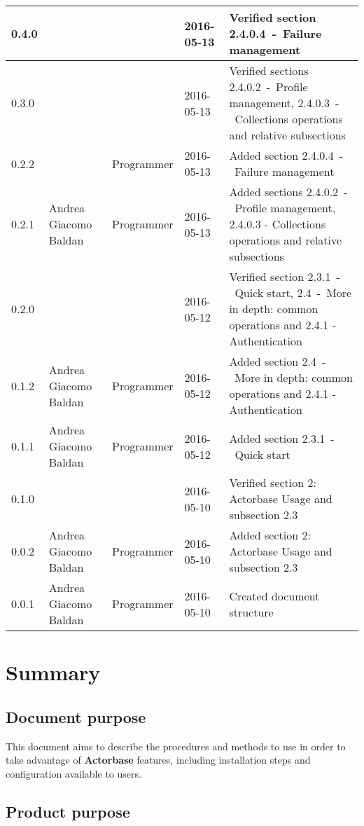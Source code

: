 \documentclass{scalatekids-article}
\begin{document}
\begin{center}
\begin{longtable}{| l | l | l | l | p{5cm} |}
    \hline
    0.4.0 & & & 2016-05-13 & Verified section 2.4.0.4\ -\ Failure management\\
    \hline
    0.3.0 & & & 2016-05-13 & Verified sections 2.4.0.2\ -\ Profile management, 2.4.0.3\ -\ Collections operations and relative subsections\\
    \hline
    0.2.2 & & Programmer & 2016-05-13 & Added section 2.4.0.4\ -\ Failure management\\
    \hline
    0.2.1 & Andrea Giacomo Baldan & Programmer & 2016-05-13 & Added sections 2.4.0.2\ -\ Profile management, 2.4.0.3 - Collections operations and relative subsections\\
    \hline
    0.2.0 &  &  & 2016-05-12 & Verified section 2.3.1\ -\ Quick start, 2.4\ -\ More in depth: common operations and 2.4.1 - Authentication\\
    \hline
    0.1.2 & Andrea Giacomo Baldan & Programmer & 2016-05-12 & Added section 2.4\ -\ More in depth: common operations and 2.4.1 - Authentication\\
    \hline
    0.1.1 & Andrea Giacomo Baldan & Programmer & 2016-05-12 & Added section 2.3.1\ -\ Quick start\\
    \hline
    0.1.0 &  &  & 2016-05-10 & Verified section 2: Actorbase Usage and subsection 2.3\\
    \hline
    0.0.2 & Andrea Giacomo Baldan & Programmer & 2016-05-10 & Added section 2: Actorbase Usage and subsection 2.3\\
    \hline
    0.0.1 & Andrea Giacomo Baldan & Programmer & 2016-05-10 & Created document structure\\
    \hline
  \end{longtable}
\end{center}
\tableofcontents
\newpage
{}
\section{Summary}

\subsection{Document purpose}

This document aims to describe the procedures and methods to use in order to take
advantage of \textbf{Actorbase} features, including installation steps and configuration
available to users.

\subsection{Product purpose}
\end{document}
